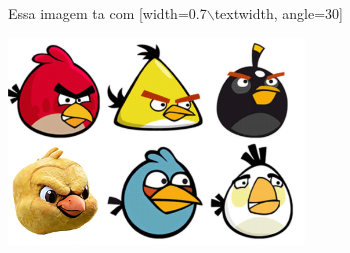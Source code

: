 \documentclass[a4paper,11pt]{report}
\begin{document}
\section{}
\begin{figure}[htbp]
Essa imagem ta com [width=0.7$\backslash$textwidth, angle=30]
\begin{center}
\includegraphics[width=0.7\textwidth, angle=30]{Pistola_Birds.png}
\end{center}
\end{figure}
\end{document}
